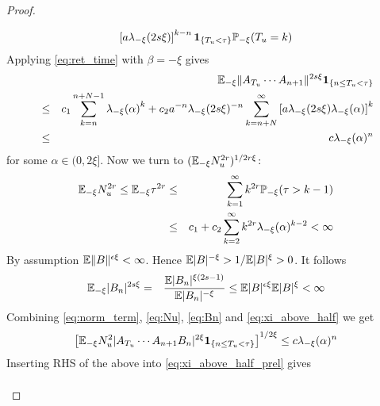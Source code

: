 \documentclass{article}
\theoremstyle{remark}
\begin{document}
\begin{proof}
\begin{enumerate}
\begin{enumerate}
\begin{eqnarray*}
        \left[a\lambda_{-\xi}(2s\xi)\right]^{k-n}
        \mathbf{1}_{\{T_u < \tau\}} \mathbb{P}_{-\xi}(T_u = k) \\
      \end{eqnarray*}
      Applying \eqref{eq:ret_time} with $\beta = -\xi$ gives
      \begin{eqnarray}
        && \mathbb{E}_{-\xi} \|A_{T_u} \cdots A_{n+1}\|^{2s\xi}
        \mathbf{1}_{\{n \leq T_u < \tau\}} \nonumber \\
        &\leq& c_1 \sum_{k=n}^{n+N-1} {\lambda_{-\xi}(\alpha)}^k +
        c_2 a^{-n} \lambda_{-\xi}(2s\xi)^{-n}
        \sum_{k=n+N}^\infty \left[
          a \lambda_{-\xi}(2s\xi)
          \lambda_{-\xi}(\alpha)
        \right]^k \nonumber \\
        &\leq& c \lambda_{-\xi}(\alpha)^n \label{eq:norm_term}
      \end{eqnarray}
      for some $\alpha \in (0, 2\xi]$. Now we turn to $(\mathbb{E}_{-\xi}
      N_u^{2r})^{1/2r\xi}$:
      \begin{eqnarray}
        \mathbb{E}_{-\xi} N_u^{2r} \leq \mathbb{E}_{-\xi} \tau^{2r} &\leq&
        \sum_{k=1}^{\infty} k^{2r} \mathbb{P}_{-\xi}(\tau > k-1)
        \nonumber \\
        &\leq& c_1 + c_2 \sum_{k=2}^{\infty} k^{2r}
        \lambda_{-\xi}(\alpha)^{k-2} < \infty \label{eq:Nu}
      \end{eqnarray}
      By assumption $\mathbb{E} \|B\|^{\epsilon \xi} < \infty$. Hence
      $\mathbb{E}|B|^{-\xi} > 1/\mathbb{E}|B|^\xi > 0$. It follows
      \begin{eqnarray}
        \mathbb{E}_{-\xi}|B_n|^{2s\xi} &=& {
          \mathbb{E} |B_n|^{\xi(2s - 1)}
          \over
          \mathbb{E} |B_n|^{-\xi}
        } \leq \mathbb{E} |B|^{\epsilon \xi} \mathbb{E} |B|^{\xi} < \infty \label{eq:Bn}
      \end{eqnarray}
      Combining \eqref{eq:norm_term}, \eqref{eq:Nu}, \eqref{eq:Bn} and
      \eqref{eq:xi_above_half} we get
      \begin{eqnarray}
        \left[ \mathbb{E}_{-\xi} N_u^2 
          |A_{T_u} \cdots A_{n+1} B_n|^{2\xi}
          \mathbf{1}_{\{n \leq T_u < \tau\}} \right]^{1/2\xi} \leq c
        \lambda_{-\xi}(\alpha)^n \label{eq:xi_above_half_final}
      \end{eqnarray}
      Inserting RHS of the above into \eqref{eq:xi_above_half_prel}
      gives
      \begin{eqnarray*}

\end{eqnarray*}
\end{enumerate}
\end{enumerate}
\end{proof}
\end{document}
